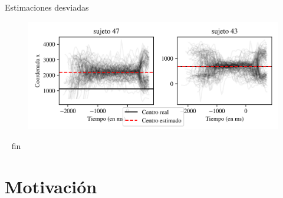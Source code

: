 \documentclass[aspectratio=169]{beamer}
\begin{document}
\begin{frame}{Estimaciones desviadas}
  \begin{figure}
    \centering
    \includegraphics[width=\linewidth]{plots/skewed-estimations-examples.png}
  \end{figure}
\end{frame}
\begin{frame}{~}
  fin
\end{frame}


\section{Motivación}
\end{document}
